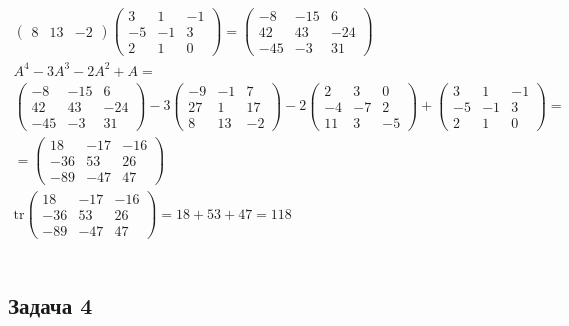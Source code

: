 \begin{gather*}
\begin{pmatrix}
				8 & 13 & -2
			\end{pmatrix}
			\begin{pmatrix}
				3 & 1 & -1\\
				-5 & -1 & 3\\
				2 & 1 & 0
			\end{pmatrix}
			=
			\begin{pmatrix}
				-8 & -15 & 6\\
				42 & 43 & -24\\
				-45 & -3 & 31
			\end{pmatrix}\\
			A^4 - 3A^3 - 2A^2 + A=\\ 
			\begin{pmatrix}
				-8 & -15 & 6\\
				42 & 43 & -24\\
				-45 & -3 & 31
			\end{pmatrix}
			- 3
			\begin{pmatrix}
				-9 & -1 & 7\\
				27 & 1 & 17\\
				8 & 13 & -2
			\end{pmatrix}
			- 2
			\begin{pmatrix}
				2 & 3 & 0\\
				-4 & -7 & 2\\
				11 & 3 & -5
			\end{pmatrix}
			+
			\begin{pmatrix}
				3 & 1 & -1\\
				-5 & -1 & 3\\
				2 & 1 & 0
			\end{pmatrix}
			= \\ =
			\begin{pmatrix}
				18 & -17 & -16\\
				-36 & 53 & 26\\
				-89 & -47 & 47
			\end{pmatrix}
			\\
			\text{tr}
			\begin{pmatrix}
			18 & -17 & -16\\
			-36 & 53 & 26\\
			-89 & -47 & 47
			\end{pmatrix}
			= 
			18 + 53 + 47
			=
			118
		\end{gather*}
		\\
		
		\subsection*{\textbf{Задача 4}}
